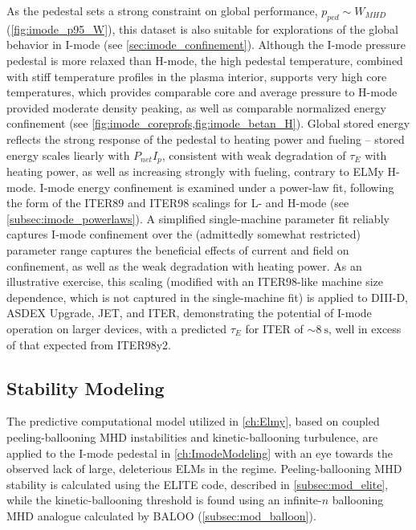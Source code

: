 As the pedestal sets a strong constraint on global performance, $p_{ped} \sim W_{MHD}$ (\cref{fig:imode_p95_W}), this dataset is also suitable for explorations of the global behavior in I-mode (see \cref{sec:imode_confinement}).  Although the I-mode pressure pedestal is more relaxed than H-mode, the high pedestal temperature, combined with stiff temperature profiles in the plasma interior, supports very high core temperatures, which provides comparable core and average pressure to H-mode provided moderate density peaking, as well as comparable normalized energy confinement (see \cref{fig:imode_coreprofs,fig:imode_betan_H}).  Global stored energy reflects the strong response of the pedestal to heating power and fueling -- stored energy scales liearly with $P_{net} I_p$, consistent with weak degradation of $\tau_E$ with heating power, as well as increasing strongly with fueling, contrary to ELMy H-mode.  I-mode energy confinement is examined under a power-law fit, following the form of the ITER89 and ITER98 scalings for L- and H-mode (see \cref{subsec:imode_powerlaws}).  A simplified single-machine parameter fit reliably captures I-mode confinement over the (admittedly somewhat restricted) parameter range captures the beneficial effects of current and field on confinement, as well as the weak degradation with heating power.  As an illustrative exercise, this scaling (modified with an ITER98-like machine size dependence, which is not captured in the single-machine fit) is applied to DIII-D, ASDEX Upgrade, JET, and ITER, demonstrating the potential of I-mode operation on larger devices, with a predicted $\tau_E$ for ITER of $\sim \SI{8}{\second}$, well in excess of that expected from ITER98y2.

\subsection{Stability Modeling}\label{subsec:conc_imode_mod}

The predictive computational model utilized in \cref{ch:Elmy}, based on coupled peeling-ballooning MHD instabilities and kinetic-ballooning turbulence, are applied to the I-mode pedestal in \cref{ch:ImodeModeling} with an eye towards the observed lack of large, deleterious ELMs in the regime.  Peeling-ballooning MHD stability is calculated using the ELITE code, described in \cref{subsec:mod_elite}, while the kinetic-ballooning threshold is found using an infinite-$n$ ballooning MHD analogue calculated by BALOO (\cref{subsec:mod_balloon}).

